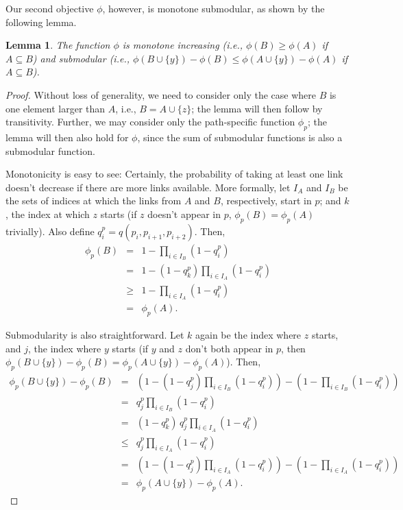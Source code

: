 \documentclass[11pt,letterpaper]{article}
\newtheorem{lemma}{Lemma}
\begin{document}
Our second objective $\phi$, however, is monotone submodular, as shown by the following lemma.

\begin{lemma}
\label{thm:monotonicity}
The function $\phi$ is monotone increasing (i.e., $\phi(B) \geq \phi(A)$ if $A \subseteq B$) and submodular (i.e., $\phi(B \cup \{y\}) - \phi(B) \leq \phi(A \cup \{y\}) - \phi(A)$ if $A \subseteq B$).
\end{lemma}

\begin{proof}[Proof]
Without loss of generality, we need to consider only the case where $B$ is one element larger than $A$, i.e., $B = A \cup \{z\}$; the lemma will then follow by transitivity. Further, we may consider only the path\hyp specific function $\phi_p$; the lemma will then also hold for $\phi$, since the sum of submodular functions is also a submodular function.

Monotonicity is easy to see: Certainly, the probability of taking at least one link doesn't decrease if there are more links available. More formally, let $I_A$ and $I_B$ be the sets of indices at which the links from $A$ and $B$, respectively, start in $p$; and $k$, the index at which $z$ starts (if $z$ doesn't appear in $p$, $\phi_p(B)=\phi_p(A)$ trivially).
Also define $q^p_i = q(p_i,p_{i+1},p_{i+2})$.
Then,
\begin{eqnarray}
\phi_p(B)  &=& 1 - \prod_{i \in I_B} \left( 1 - q^p_i \right) \\
                      &=& 1 - (1 - q^p_k) \prod_{i \in I_A} \left( 1 - q^p_i \right) \\
                      &\geq& 1 - \prod_{i \in I_A} \left( 1 - q^p_i \right) \\
                      &=& \phi_p(A).
\end{eqnarray}

Submodularity is also straightforward. Let $k$ again be the index where $z$ starts, and $j$, the index where $y$ starts (if $y$ and $z$ don't both appear in $p$, then $\phi_p(B \cup \{y\}) - \phi_p(B) = \phi_p(A \cup \{y\}) - \phi_p(A)$). Then,
\begin{eqnarray}
\phi_p(B \cup \{y\}) - \phi_p(B) 
  &=& \left(1 - (1 - q^p_j) \prod_{i \in I_B} \left( 1 - q^p_i \right)\right)
    - \left(1 - \prod_{i \in I_B} \left( 1 - q^p_i \right)\right) \\
  &=& q^p_j \prod_{i \in I_B} \left( 1 - q^p_i \right) \\
  &=& (1 - q^p_k) \, q^p_j \prod_{i \in I_A} \left( 1 - q^p_i \right) \\
  &\leq& q^p_j \prod_{i \in I_A} \left( 1 - q^p_i \right) \\
  &=& \left(1 - (1 - q^p_j) \prod_{i \in I_A} \left( 1 - q^p_i \right)\right)
    - \left(1 - \prod_{i \in I_A} \left( 1 - q^p_i \right)\right) \\
  &=& \phi_p(A \cup \{y\}) - \phi_p(A).
\end{eqnarray}
\end{proof}
\end{document}
